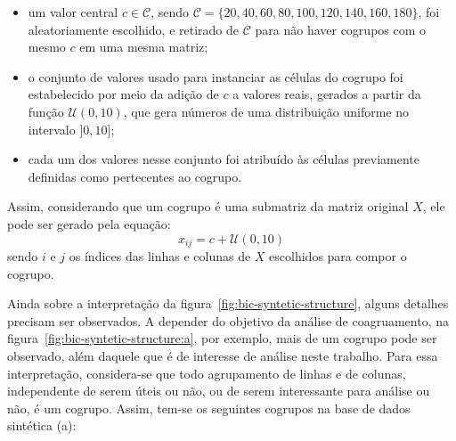 \documentclass[
    12pt,                %
    oneside,            %
    a4paper,            %
    english,            %
    brazil                %
    ]{abntex2ppgsi}
\begin{document}

\begin{itemize}
    \item um valor central $c \in \mathcal{C}$, sendo $\mathcal{C} = \{ 20, 40, 60, 80, 100, 120, 140, 160, 180 \}$, foi aleatoriamente escolhido, e retirado de $\mathcal{C}$ para não haver cogrupos com o mesmo $c$ em uma mesma matriz;
    \item o conjunto de valores usado para instanciar as células do cogrupo foi estabelecido por meio da adição de $c$ a valores reais, gerados a partir da função $\mathcal{U}(0, 10)$, que gera números de uma distribuição uniforme no intervalo $]0, 10]$;
    \item cada um dos valores nesse conjunto foi atribuído às células previamente definidas como pertecentes ao cogrupo.
\end{itemize}

Assim, considerando que um cogrupo é uma submatriz da matriz original $X$, ele pode ser gerado pela equação:
\[
    x_{ij} = c + \mathcal{U}(0, 10)
\]
sendo $i$ e $j$ os índices das linhas e colunas de $X$ escolhidos para compor o cogrupo.

Ainda sobre a interpretação da figura~\ref{fig:bic-syntetic-structure}, alguns detalhes precisam ser observados.
A depender do objetivo da análise de coagruamento, na figura~\ref{fig:bic-syntetic-structure:a}, por exemplo, mais de um cogrupo pode ser observado, além daquele que é de interesse de análise neste trabalho.
Para essa interpretação, considera-se que todo agrupamento de linhas e de colunas, independente de serem úteis ou não, ou de serem interessante para análise ou não, é um cogrupo.
Assim, tem-se os seguintes cogrupos na base de dados sintética (a):
\end{document}
